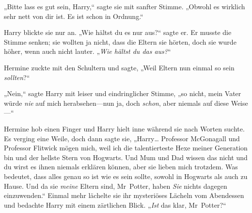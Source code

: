 „Bitte lass es gut sein, Harry,“ sagte sie mit sanfter Stimme. „Obwohl es wirklich sehr nett von dir ist. Es ist schon in Ordnung.“

Harry blickte sie nur an. „Wie hältst du es nur aus?“ sagte er. Er musste die Stimme senken; sie wollten ja nicht, dass die Eltern sie hörten, doch sie wurde höher, wenn auch nicht lauter. „\emph{Wie hältst du das aus?}“

Hermine zuckte mit den Schultern und sagte, „Weil Eltern nun einmal so sein \emph{sollten}?“

„Nein,“ sagte Harry mit leiser und eindringlicher Stimme, „so nicht, mein Vater würde \emph{nie} auf mich herabsehen—nun ja, doch \emph{schon}, aber niemals auf diese Weise—“

Hermine hob einen Finger und Harry hielt inne während sie nach Worten suchte. Es verging eine Weile, doch dann sagte sie, „Harry… Professor McGonagall und Professor Flitwick mögen mich, weil ich die talentierteste Hexe meiner Generation bin und der hellste Stern von Hogwarts. Und Mum und Dad wissen das nicht und du wirst es ihnen niemals erklären können, aber sie lieben mich trotzdem. Was bedeutet, dass alles genau so ist wie es sein sollte, sowohl in Hogwarts als auch zu Hause. Und da sie \emph{meine} Eltern sind, Mr~Potter, haben \emph{Sie} nichts dagegen einzuwenden.“ Einmal mehr lächelte sie ihr mysteriöses Lächeln vom Abendessen und bedachte Harry mit einem zärtlichen Blick. „\emph{Ist} das klar, Mr~Potter?“

